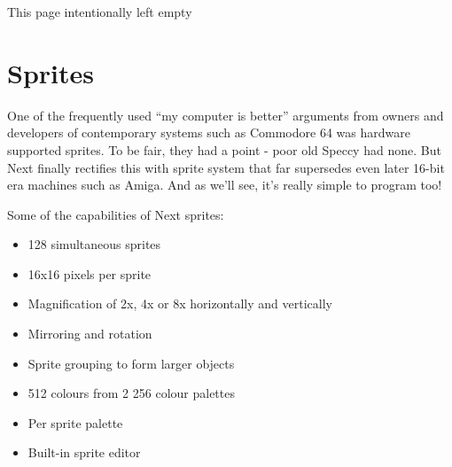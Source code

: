\documentclass[12pt,twoside,openright,a4paper]{book}
\newcommand{\IntentionallyEmpty}{
	\mbox{}
	\vfill
	\begin{center}
	This page intentionally left empty
	\end{center}
	\vfill
	\mbox{}
}
\begin{document}
\pagebreak
\IntentionallyEmpty
\pagebreak

\section{Sprites}
\label{zx_next_sprites}


One of the frequently used ``my computer is better'' arguments from owners and developers of contemporary systems such as Commodore 64 was hardware supported sprites. To be fair, they had a point - poor old Speccy had none. But Next finally rectifies this with sprite system that far supersedes even later 16-bit era machines such as Amiga. And as we'll see, it's really simple to program too!

Some of the capabilities of Next sprites:

\begin{itemize}[topsep=1pt,itemsep=1pt]
	\item 128 simultaneous sprites
	\item 16x16 pixels per sprite
	\item Magnification of 2x, 4x or 8x horizontally and vertically
	\item Mirroring and rotation
	\item Sprite grouping to form larger objects
	\item 512 colours from 2 256 colour palettes
	\item Per sprite palette
	\item Built-in sprite editor
\end{itemize}
\end{document}
